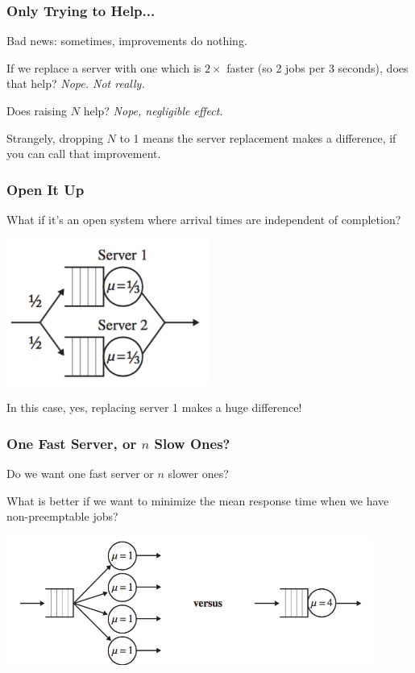 \begin{frame}
\frametitle{Only Trying to Help...}

Bad news: sometimes, improvements do nothing. 

If we replace a server with one which is $2\times$ faster (so 2 jobs per 3 seconds), does that help? \emph{Nope. Not really.}

Does raising $N$ help? \emph{Nope, negligible effect.}

Strangely, dropping $N$ to 1 means the server replacement makes a difference, if you can call that improvement.

\end{frame}



\begin{frame}
\frametitle{Open It Up}

What if it's an \alert{open system} where arrival times are independent of completion?

\begin{center}
	\includegraphics[width=0.5\textwidth]{images/qt-example2-2.png}
\end{center}

In this case, yes, replacing server 1 makes a huge difference!

\end{frame}



\begin{frame}
\frametitle{One Fast Server, or $n$ Slow Ones?}

Do we want one fast server or $n$ slower ones? 

What is better if we want to minimize the mean response time when we have non-preemptable jobs?

\begin{center}
	\includegraphics[width=0.9\textwidth]{images/qt-example3.png}
\end{center}

\end{frame}



